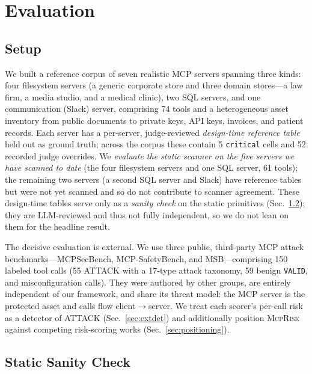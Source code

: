 \documentclass[conference]{IEEEtran}
\newcommand{\framework}{\textsc{McpRisk}}
\begin{document}
\section{Evaluation}
\label{sec:eval}

\subsection{Setup}

We built a reference corpus of seven realistic MCP servers spanning three kinds:
four filesystem servers (a generic corporate store and three domain stores---a law
firm, a media studio, and a medical clinic), two SQL servers, and one
communication (Slack) server, comprising 74 tools and a heterogeneous asset
inventory from public documents to private keys, API keys, invoices, and patient
records. Each server has a per-server, judge-reviewed \emph{design-time reference
table} held out as ground truth; across the corpus these contain 5 \texttt{critical}
cells and 52 recorded judge overrides. We \emph{evaluate the static scanner on the
five servers we have scanned to date} (the four filesystem servers and one SQL
server, 61 tools); the remaining two servers (a second SQL server and Slack) have
reference tables but were not yet scanned and so do not contribute to scanner
agreement. These design-time tables serve only as a \emph{sanity check} on the
static primitives (Sec.~\ref{sec:results}); they are LLM-reviewed and thus not fully
independent, so we do not lean on them for the headline result.

The decisive evaluation is external. We use three public, third-party MCP attack
benchmarks---MCPSecBench, MCP-SafetyBench, and MSB---comprising 150 labeled tool
calls (55 ATTACK with a 17-type attack taxonomy, 59 benign \texttt{VALID}, and
misconfiguration calls). They were authored by other groups, are entirely
independent of our framework, and share its threat model: the MCP server is the
protected asset and calls flow client$\rightarrow$server. We treat each scorer's
per-call risk as a detector of ATTACK (Sec.~\ref{sec:extdet}) and additionally
position \framework{} against competing risk-scoring works (Sec.~\ref{sec:positioning}).

\subsection{Static Sanity Check}
\label{sec:results}
\end{document}
